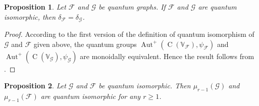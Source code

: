 \documentclass[11pt,reqno]{amsart}
\newtheorem{proposition}{Proposition}[section]
\DeclareMathOperator{\Aut}{Aut}
\DeclareMathOperator{\C}{C}
\begin{document}
\begin{proposition}\label{prop:deltas}
Let $\mathcal{F}$ and $\mathcal{G}$ be quantum graphs. If $\mathcal{F}$ and $\mathcal{G}$ are quantum isomorphic, then $\delta_{\scriptscriptstyle\mathcal{F}}=\delta_{\scriptscriptstyle\mathcal{G}}$.
\end{proposition}

\begin{proof}
According to the first version of the definition of quantum isomorphism of $\mathcal{G}$ and $\mathcal{F}$ given above, the quantum groups $\Aut^+(\C(\mathbb{V}_{\scriptscriptstyle\mathcal{F}}),\psi_{\scriptscriptstyle\mathcal{F}})$ and $\Aut^+(\C(\mathbb{V}_{\scriptscriptstyle\mathcal{G}}),\psi_{\scriptscriptstyle\mathcal{G}})$ are monoidally equivalent. Hence the result follows from \cite[Theorem 4.7]{Rijdt}.
\end{proof}

\begin{proposition}%
Let $\mathcal{G}$ and $\mathcal{F}$ be quantum isomorphic. Then $\mu_{r-1}(\mathcal{G})$ and $\mu_{r-1}(\mathcal{F})$ are quantum isomorphic for any $r\geq 1$.
\end{proposition}
\end{document}
